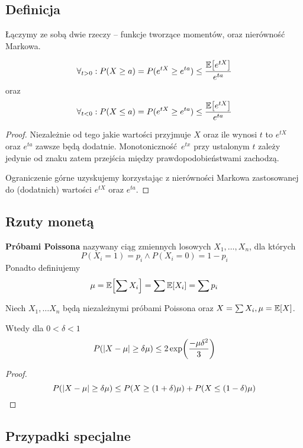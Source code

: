 \subsection{Definicja}
Łączymy ze sobą dwie rzeczy -- funkcje tworzące momentów, oraz nierówność Markowa.
\begin{theorem}
    \[
        \forall_{t > 0} : P(X \geq a) = P(e^{tX} \geq e^{ta}) \leq \frac{\expected{e^{tX}}}{e^{ta}}
    \]
    oraz
    \[
        \forall_{t < 0} : P(X \leq a) = P(e^{tX} \geq e^{ta}) \leq \frac{\expected{e^{tX}}}{e^{ta}}
    \]
\end{theorem}
\begin{proof}
    Niezależnie od tego jakie wartości przyjmuje \( X \) oraz ile wynosi \( t \) to \( e^{tX} \) oraz \( e^{ta} \) zawsze będą dodatnie.
    Monotoniczność \( e^{tx} \) przy ustalonym \( t \) zależy jedynie od znaku zatem przejścia między prawdopodobieństwami zachodzą.
    
    Ograniczenie górne uzyskujemy korzystając z nierówności Markowa zastosowanej do (dodatnich) wartości \( e^{tX} \) oraz \( e^{ta} \).
\end{proof}

\subsection{Rzuty monetą}

\begin{definition}
    \textbf{Próbami Poissona} nazywany ciąg zmiennych losowych \( X_1, \dots, X_n \), dla których
    \[
        P(X_i = 1) = p_i \land P(X_i = 0) = 1 - p_i
    \]
    Ponadto definiujemy 
    \[
        \mu = \expected{\sum X_i} = \sum \expected{X_i} = \sum p_i
    \]
\end{definition}

\begin{lemma}
    \label{independent-poisson-trials-abs-bound}
    Niech \( X_1, \dots X_n \) będą niezależnymi próbami Poissona oraz \( X = \sum X_i, \mu = \expected{X} \). 
    
    Wtedy dla \( 0 < \delta < 1 \)
    \[
        P(\abs{X - \mu} \geq \delta \mu) \leq 2 \exp\pars{\frac{-\mu\delta^2}{3}}
    \]
\end{lemma}
\begin{proof}
    \[
        P(\abs{X - \mu} \geq \delta\mu) \leq P\pars{X \geq (1 + \delta)\mu} + P\pars{X \leq (1 - \delta)\mu}
    \]
\end{proof}

\subsection{Przypadki specjalne}

